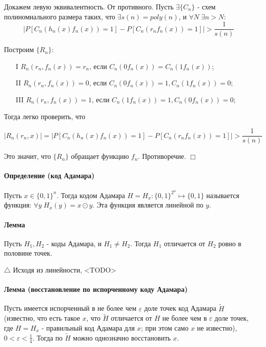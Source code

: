\documentclass[12pt, a4paper]{article}
\newcommand{\bool}{\{0, 1\}}
\newcommand{\eps}{\varepsilon}
\begin{document}
Докажем левую эквивалентность. От противного. Пусть $\exists \{C_n\}$ - схем полиномиального размера таких, что $\exists s(n) = poly(n)$, и $\forall N \; \exists n > N$:
\[
 |P[C_n(h_n(x)f_n(x)) = 1] - P[C_n(r_n f_n(x)) = 1]| > \frac{1}{s(n)}
\]

Построим $\{R_n\}$:

\begin{itemize}
 \item[I] $R_n(r_n, f_n(x)) = r_n$, если $C_n(0 f_n(x)) = C_n(1 f_n(x))$;
 \item[II] $R_n(r_n, f_n(x)) = 0$, если $C_n(0 f_n(x)) = 1, C_n(1 f_n(x)) = 0$;
 \item[III] $R_n(r_n, f_n(x)) = 1$, если $C_n(1 f_n(x)) = 1, C_n(0 f_n(x)) = 0$;
\end{itemize}

Тогда легко проверить, что 

\[
 |R_n(r_n, x)| = |P[C_n(h_n(x)f_n(x)) = 1] - P[C_n(r_n f_n(x)) = 1]| > \frac{1}{s(n)}
\]

Это значит, что $\{R_n\}$ обращает функцию $f_n$. Противоречие. $\Box$

\paragraph{Определение (код Адамара)} Пусть $x \in \bool^n$. Тогда кодом Адамара $H = H_x : \bool^{2^n} \mapsto \bool$ называется функция: $\forall y \; H_x(y) = x \odot y$. Эта функция является линейной по $y$.

\paragraph{Лемма} Пусть $H_1, H_2$ - коды Адамара, и $H_1 \neq H_2$. Тогда $H_1$ отличается от $H_2$ ровно в половине точек.

$\triangle$ Исходя из линейности, <TODO>

\paragraph{Лемма (восстановление по испорченному коду Адамара)} Пусть имеется испорченный в не более чем $\eps$ доле точек код Адамара $\widetilde{H}$ (известно, что есть такое $x$, что $\widetilde{H}$ отличается от $H$ не более чем в $\eps$ доле точек, где $H = H_x$ - правильный код Адамара для $x$; при этом само $x$ не известно), $0 < \eps < \frac{1}{4}$. Тогда по $\widetilde{H}$ можно однозначно восстановить $x$.
\end{document}

